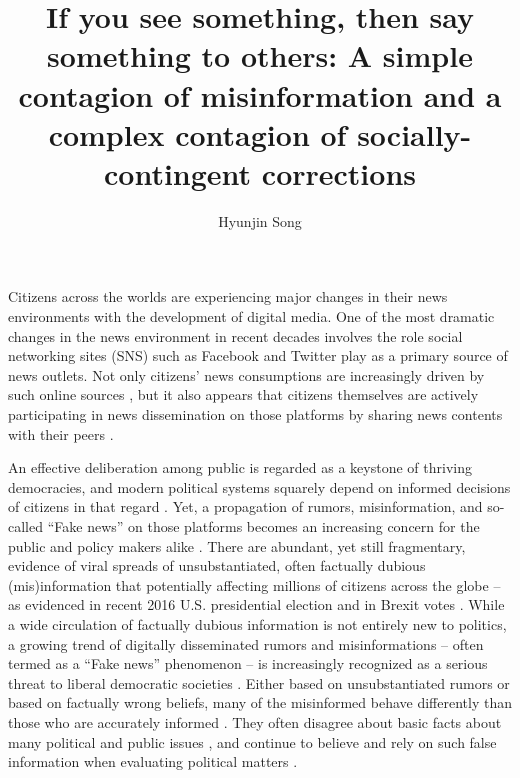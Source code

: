 \documentclass[man, 12pt, a4paper]{apa6}
\title{If you see something, then say something to others: A simple contagion of misinformation and a complex contagion of socially-contingent corrections}
\author{Hyunjin Song}
\affiliation{Department of Communication, University of Vienna, Austria}
\begin{document}
\maketitle
  Citizens across the worlds are experiencing major changes in their news environments with the development of digital media. One of the most dramatic changes in the news environment in recent decades involves the role social networking sites (SNS) such as Facebook and Twitter play as a primary source of news outlets. Not only citizens' news consumptions are increasingly driven by such online sources \parencite{shearer2017news}, but it also appears that citizens themselves are actively participating in news dissemination on those platforms by sharing news contents with their peers \parencite[e.g.,][]{weeks2013dissemination, lee2017people}. 

  An effective deliberation among public is regarded as a keystone of thriving democracies, and modern political systems squarely depend  on  informed  decisions of citizens in that regard \parencite{carpini1996, stromback2005search}. Yet, a propagation of rumors, misinformation, and so-called \enquote{Fake news} on those platforms becomes an increasing concern for the public and policy makers alike \parencite{allcott2017social}. There are abundant, yet still fragmentary, evidence of viral spreads of unsubstantiated, often factually dubious (mis)information that potentially affecting millions of citizens across the globe -- as evidenced in recent 2016 U.S. presidential election \parencite{guess2018selective, giglietto2016fakes, allcott2017social} and in Brexit votes \parencite{nyt_2017}. While a wide circulation of factually dubious information is not entirely new to politics, a growing trend of digitally disseminated rumors and misinformations -- often termed as a \enquote{Fake news} phenomenon -- is increasingly recognized as a serious threat to liberal democratic societies \parencite{allcott2017social}. Either based on unsubstantiated rumors or based on factually wrong beliefs, many of the misinformed behave differently than those who are accurately informed \parencite{kuklinski2000misinformation,Garrett_Weeks_2013}. They often disagree about basic facts about many political and public issues \parencite[e.g.,][]{nisbet2015partisan}, and continue to believe and rely on such false information when evaluating political matters \parencite{nyhan2010corrections,thorson_2016}. 
\end{document}
